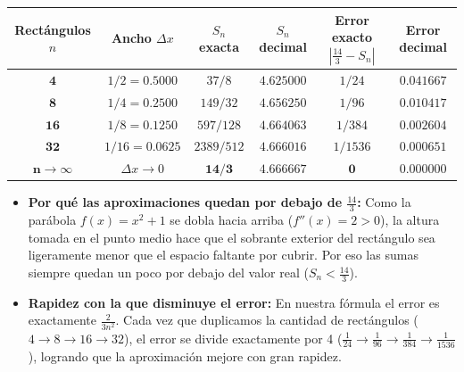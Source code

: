 \documentclass[10pt, a4paper]{article}
\begin{document}
\begin{center}
\setlength{\tabcolsep}{8pt}
\begin{tabular}{@{} c c c c c c @{}}
\toprule
\textbf{Rectángulos $n$} & \textbf{Ancho $\Delta x$} & \textbf{$S_n$ exacta} & \textbf{$S_n$ decimal} & \textbf{Error exacto $\left|\frac{14}{3} - S_n\right|$} & \textbf{Error decimal} \\
\midrule
$\mathbf{4}$ & $1/2 = 0.5000$ & $37/8$ & $4.625000$ & $1/24$ & $0.041667$ \\
$\mathbf{8}$ & $1/4 = 0.2500$ & $149/32$ & $4.656250$ & $1/96$ & $0.010417$ \\
$\mathbf{16}$ & $1/8 = 0.1250$ & $597/128$ & $4.664063$ & $1/384$ & $0.002604$ \\
$\mathbf{32}$ & $1/16 = 0.0625$ & $2389/512$ & $4.666016$ & $1/1536$ & $0.000651$ \\
\midrule
$\mathbf{n \to \infty}$ & $\Delta x \to 0$ & $\mathbf{14/3}$ & $\mathbf{4.666667}$ & $\mathbf{0}$ & $\mathbf{0.000000}$ \\
\bottomrule
\end{tabular}
\end{center}

\begin{itemize}[leftmargin=1.5em, itemsep=2pt, topsep=2pt]
    \item \textbf{Por qué las aproximaciones quedan por debajo de $\frac{14}{3}$:} Como la parábola $f(x)=x^2+1$ se dobla hacia arriba ($f''(x) = 2 > 0$), la altura tomada en el punto medio hace que el sobrante exterior del rectángulo sea ligeramente menor que el espacio faltante por cubrir. Por eso las sumas siempre quedan un poco por debajo del valor real ($S_n < \frac{14}{3}$).
    \item \textbf{Rapidez con la que disminuye el error:} En nuestra fórmula el error es exactamente $\frac{2}{3n^2}$. Cada vez que duplicamos la cantidad de rectángulos ($4 \to 8 \to 16 \to 32$), el error se divide exactamente por 4 ($\frac{1}{24} \to \frac{1}{96} \to \frac{1}{384} \to \frac{1}{1536}$), logrando que la aproximación mejore con gran rapidez.
\end{itemize}
\end{document}
